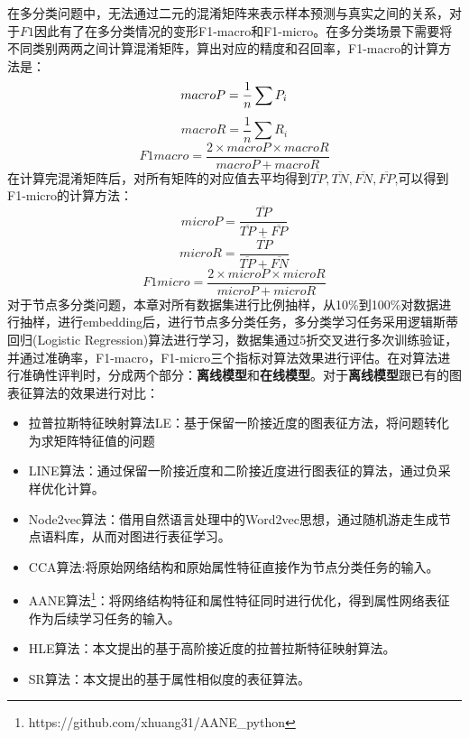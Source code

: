 在多分类问题中，无法通过二元的混淆矩阵来表示样本预测与真实之间的关系，对于$F1$因此有了在多分类情况的变形F1-macro和F1-micro。在多分类场景下需要将不同类别两两之间计算混淆矩阵，算出对应的精度和召回率，F1-macro的计算方法是：
\begin{equation}
	macro\-P = \frac{1}{n}\sum P_i
\end{equation}
\begin{equation}
macroR = \frac{1}{n}\sum R_i
\end{equation}
\begin{equation}
F1macro = \frac{2\times macroP\times macroR}{macroP+macroR}
\end{equation}
在计算完混淆矩阵后，对所有矩阵的对应值去平均得到$\overline{TP}, \overline{TN}, \overline{FN},\overline{FP}$,可以得到F1-micro的计算方法：
\begin{equation}
microP = \frac{\overline{TP}}{\overline{TP}+\overline{FP}}
\end{equation}
\begin{equation}
microR = \frac{\overline{TP}}{\overline{TP}+\overline{FN}}
\end{equation}
\begin{equation}
F1micro = \frac{2\times microP\times microR}{microP+microR}
\end{equation}
对于节点多分类问题，本章对所有数据集进行比例抽样，从10\%到100\%对数据进行抽样，进行embedding后，进行节点多分类任务，多分类学习任务采用逻辑斯蒂回归(Logistic Regression)算法进行学习，数据集通过5折交叉进行多次训练验证，并通过准确率，F1-macro，F1-micro三个指标对算法效果进行评估。在对算法进行准确性评判时，分成两个部分：\textbf{离线模型}和\textbf{在线模型}。对于\textbf{离线模型}跟已有的图表征算法的效果进行对比：
\begin{itemize}
	\item 拉普拉斯特征映射算法LE：基于保留一阶接近度的图表征方法，将问题转化为求矩阵特征值的问题
	\item LINE算法：通过保留一阶接近度和二阶接近度进行图表征的算法，通过负采样优化计算。
	\item Node2vec算法：借用自然语言处理中的Word2vec思想，通过随机游走生成节点语料库，从而对图进行表征学习。
	\item CCA算法\cite{hardoon2004canonical}:将原始网络结构和原始属性特征直接作为节点分类任务的输入。
	\item AANE算法\cite{huang2017label}\footnote{https://github.com/xhuang31/AANE\_python}：将网络结构特征和属性特征同时进行优化，得到属性网络表征作为后续学习任务的输入。
	\item HLE算法：本文提出的基于高阶接近度的拉普拉斯特征映射算法。
	\item SR算法：本文提出的基于属性相似度的表征算法。
\end{itemize}
